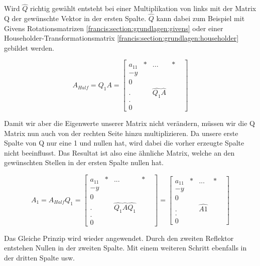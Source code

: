 Wird $\hat{Q}$ richtig gewählt entsteht bei einer Multiplikation von links mit der Matrix Q der gewünschte Vektor in der ersten Spalte.
$\hat{Q}$ kann dabei zum Beispiel mit Givens Rotationsmatrizen \ref{francis:section:grundlagen:givens} oder einer Householder-Transformationsmatrix \ref{francis:section:grundlagen:householder} gebildet werden.

\begin{equation}
	A_{Half}=Q_{1}A=
	\begin{bmatrix}
	a_{11} & * & ... & *\\
	-y & \\
	0 & & & &\\
	. & &\hat{Q_1}\hat{A} & &\\
	. & & & &\\
	0 & & & &
	\end{bmatrix}
\end{equation}

Damit wir aber die Eigenwerte unserer Matrix nicht verändern, müssen wir die Q Matrix nun auch von der rechten Seite hinzu multiplizieren.
Da unsere erste Spalte von Q nur eine 1 und nullen hat, wird dabei die vorher erzeugte Spalte nicht beeinflusst.
Das Resultat ist also eine ähnliche Matrix, welche an den gewünschten Stellen in der ersten Spalte nullen hat.

\begin{equation}
	A_{1}=A_{Half}Q_{1}=
	\begin{bmatrix}
	a_{11} & * & ... & *\\
	-y & \\
	0 & & & &\\
	. & &\hat{Q_1}\hat{A}\hat{Q_1} & &\\
	. & & & &\\
	0 & & & &
	\end{bmatrix}
	=
	\begin{bmatrix}
	a_{11} & * & ... & *\\
	-y & \\
	0 & & & &\\
	. & &\hat{A1} & &\\
	. & & & &\\
	0 & & & &
	\end{bmatrix}
\end{equation}	

Das Gleiche Prinzip wird wieder angewendet.
Durch den zweiten Reflektor entstehen Nullen in der zweiten Spalte.
Mit einem weiteren Schritt ebenfalls in der dritten Spalte usw.

